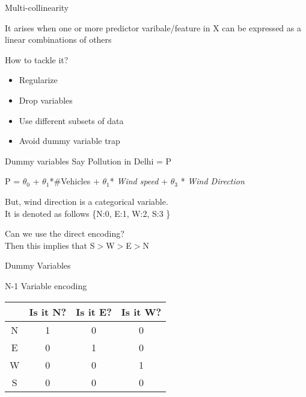 \documentclass{beamer}
\begin{document}
\begin{frame}{Multi-collinearity}

It arises when one or more predictor varibale/feature in X can be expressed as a linear combinations of others\\
\vspace{5mm}



How to tackle it?
\begin{itemize}
    \item<+-> Regularize
    \item<+-> Drop variables
    \item<+-> Use different subsets of data
    \item<+-> Avoid dummy variable trap
\end{itemize}
\end{frame}
\begin{frame}{Dummy variables}
Say Pollution in Delhi = P
\pause \begin{center}
	P = $\theta_{0}$ + $\theta_{1}$*\#Vehicles + $\theta_{1}$*
	\textit{Wind speed} + $\theta_{3}$ * \textit{Wind Direction}
\end{center}

\pause But, wind direction is a categorical variable. \\
\pause It is denoted as follows \{N:0, E:1, W:2, S:3 \}\\
\vspace{3em}

\pause Can we use the direct encoding? \\
\pause Then this implies that S$>$W$>$E$>$N
\end{frame}

\begin{frame}{Dummy Variables}
\begin{center}

N-1 Variable encoding\\
\vspace{1em}
\begin{tabular}{|c|c|c|c|}
	\hline
	& Is it N? &Is it E? &Is it W?\\
	\hline
	\hline
	N & 1&0&0 \\
	E & 0&1&0\\
	W & 0&0&1\\
	S & 0&0&0\\
	\hline
\end{tabular}

\end{center}
\end{frame}
\end{document}
